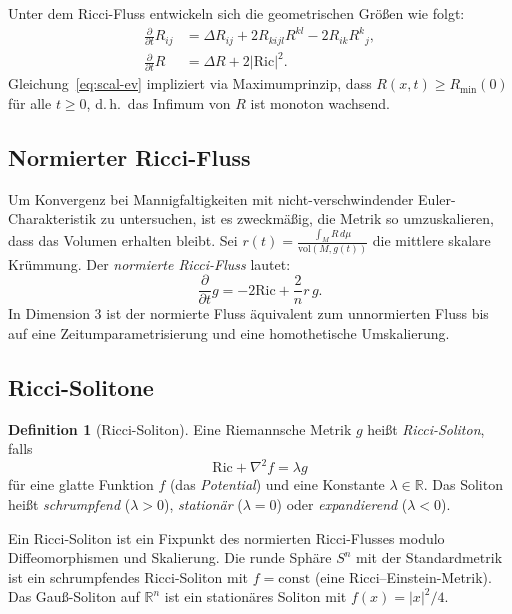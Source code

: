 \documentclass[12pt,a4paper]{amsart}
\theoremstyle{definition}
\newtheorem{definition}[theorem]{Definition}
\theoremstyle{remark}
\newcommand{\R}{\mathbb{R}}
\newcommand{\Ric}{\mathrm{Ric}}
\newcommand{\vol}{\mathrm{vol}}
\begin{document}
Unter dem Ricci-Fluss entwickeln sich die geometrischen Größen wie folgt:
\begin{align}
  \frac{\partial}{\partial t} R_{ij} &= \Delta R_{ij} + 2 R_{kijl}R^{kl}
     - 2 R_{ik}R^k{}_j, \label{eq:ric-ev} \\
  \frac{\partial}{\partial t} R &= \Delta R + 2|\Ric|^2. \label{eq:scal-ev}
\end{align}
Gleichung~\eqref{eq:scal-ev} impliziert via Maximumprinzip, dass
$R(x,t) \geq R_{\min}(0)$ für alle $t \geq 0$, d.\,h.\ das Infimum von $R$
ist monoton wachsend.

\subsection{Normierter Ricci-Fluss}

Um Konvergenz bei Mannigfaltigkeiten mit nicht-verschwindender
Euler-Charakteristik zu untersuchen, ist es zweckmäßig, die Metrik so
umzuskalieren, dass das Volumen erhalten bleibt.  Sei
$r(t) = \frac{\int_M R\,d\mu}{\vol(M,g(t))}$ die mittlere skalare Krümmung.
Der \emph{normierte Ricci-Fluss} lautet:
\begin{equation}
  \label{eq:nrf}
  \frac{\partial}{\partial t} g = -2\Ric + \frac{2}{n} r\, g.
\end{equation}
In Dimension $3$ ist der normierte Fluss äquivalent zum unnormierten Fluss
bis auf eine Zeitumparametrisierung und eine homothetische Umskalierung.

\subsection{Ricci-Solitone}

\begin{definition}[Ricci-Soliton]
Eine Riemannsche Metrik $g$ heißt \emph{Ricci-Soliton}, falls
\[
  \Ric + \nabla^2 f = \lambda g
\]
für eine glatte Funktion $f$ (das \emph{Potential}) und eine Konstante
$\lambda \in \R$.  Das Soliton heißt \emph{schrumpfend} ($\lambda > 0$),
\emph{stationär} ($\lambda = 0$) oder \emph{expandierend} ($\lambda < 0$).
\end{definition}

Ein Ricci-Soliton ist ein Fixpunkt des normierten Ricci-Flusses modulo
Diffeomorphismen und Skalierung.  Die runde Sphäre $S^n$ mit der
Standardmetrik ist ein schrumpfendes Ricci-Soliton mit $f = \mathrm{const}$
(eine Ricci--Einstein-Metrik).  Das Gauß-Soliton auf $\R^n$ ist ein
stationäres Soliton mit $f(x) = |x|^2/4$.
\end{document}
